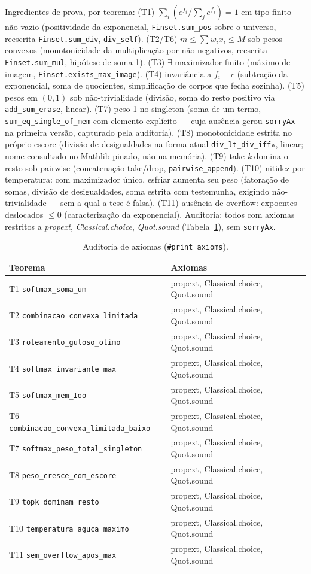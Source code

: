 Ingredientes de prova, por teorema: (T1) $\sum_i(e^{f_i}/\sum_j e^{f_j})=1$ em tipo finito não vazio (positividade da exponencial, \texttt{Finset.sum\_pos} sobre o universo, reescrita \texttt{Finset.sum\_div}, \texttt{div\_self}). (T2/T6) $m\leq\sum w_ix_i\leq M$ sob pesos convexos (monotonicidade da multiplicação por não negativos, reescrita \texttt{Finset.sum\_mul}, hipótese de soma 1). (T3) $\exists$ maximizador finito (máximo de imagem, \texttt{Finset.exists\_max\_image}). (T4) invariância a $f_i-c$ (subtração da exponencial, soma de quocientes, simplificação de corpos que fecha sozinha). (T5) pesos em $(0,1)$ sob não-trivialidade (divisão, soma do resto positivo via \texttt{add\_sum\_erase}, linear). (T7) peso 1 no singleton (soma de um termo, \texttt{sum\_eq\_single\_of\_mem} com elemento explícito --- cuja ausência gerou \texttt{sorryAx} na primeira versão, capturado pela auditoria). (T8) monotonicidade estrita no próprio escore (divisão de desigualdades na forma atual \texttt{div\_lt\_div\_iff₀}, linear; nome consultado no Mathlib pinado, não na memória). (T9) take-\textit{k} domina o resto sob pairwise (concatenação take/drop, \texttt{pairwise\_append}). (T10) nitidez por temperatura: com maximizador único, esfriar aumenta seu peso (fatoração de somas, divisão de desigualdades, soma estrita com testemunha, exigindo não-trivialidade --- sem a qual a tese é falsa). (T11) ausência de overflow: expoentes deslocados $\leq 0$ (caracterização da exponencial). Auditoria: todos com axiomas restritos a \textit{propext}, \textit{Classical.choice}, \textit{Quot.sound} (Tabela~\ref{tab:ax}), sem \texttt{sorryAx}.
\begin{table}[h]
\centering
\caption{Auditoria de axiomas (\texttt{\#print axioms}).}
\label{tab:ax}
\begin{tabular}{ll}
\toprule
Teorema & Axiomas \\
\midrule
T1 \texttt{softmax\_soma\_um} & propext, Classical.choice, Quot.sound \\
T2 \texttt{combinacao\_convexa\_limitada} & propext, Classical.choice, Quot.sound \\
T3 \texttt{roteamento\_guloso\_otimo} & propext, Classical.choice, Quot.sound \\
T4 \texttt{softmax\_invariante\_max} & propext, Classical.choice, Quot.sound \\
T5 \texttt{softmax\_mem\_Ioo} & propext, Classical.choice, Quot.sound \\
T6 \texttt{combinacao\_convexa\_limitada\_baixo} & propext, Classical.choice, Quot.sound \\
T7 \texttt{softmax\_peso\_total\_singleton} & propext, Classical.choice, Quot.sound \\
T8 \texttt{peso\_cresce\_com\_escore} & propext, Classical.choice, Quot.sound \\
T9 \texttt{topk\_dominam\_resto} & propext, Classical.choice, Quot.sound \\
T10 \texttt{temperatura\_aguca\_maximo} & propext, Classical.choice, Quot.sound \\
T11 \texttt{sem\_overflow\_apos\_max} & propext, Classical.choice, Quot.sound \\
\bottomrule
\end{tabular}
\end{table}
